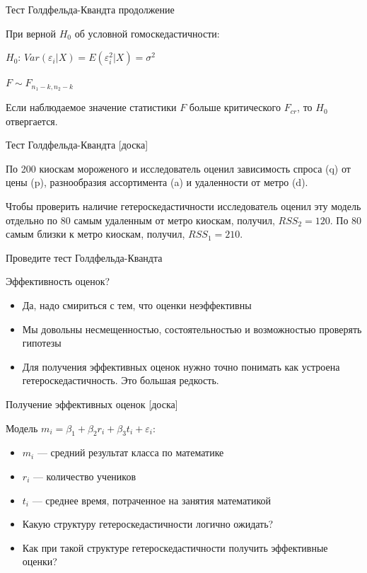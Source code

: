 \documentclass[ignorenonframetext,]{beamer}
\newcommand{\e}{\varepsilon}
\begin{document}
\begin{frame}{Тест Голдфельда-Квандта продолжение}

При верной $H_0$ об условной гомоскедастичности:

$H_0$: $Var(\e_i|X)=E(\varepsilon^2_i|X)=\sigma^2$

$F\sim F_{n_1-k,n_2-k}$

Если наблюдаемое значение статистики $F$ больше критического $F_{cr}$,
то $H_0$ отвергается.

\end{frame}

\begin{frame}{Тест Голдфельда-Квандта {[}доска{]}}

По 200 киоскам мороженого и исследователь оценил зависимость спроса (q)
от цены (p), разнообразия ассортимента (a) и удаленности от метро (d).

Чтобы проверить наличие гетероскедастичности исследователь оценил эту
модель отдельно по 80 самым удаленным от метро киоскам, получил,
$RSS_2=120$. По 80 самым близки к метро киоскам, получил, $RSS_1=210$.

Проведите тест Голдфельда-Квандта

\end{frame}

\begin{frame}{Эффективность оценок?}

\begin{itemize}
\item
  Да, надо смириться с тем, что оценки неэффективны
\item
  Мы довольны несмещенностью, состоятельностью и возможностью проверять
  гипотезы
\item
  Для получения эффективных оценок нужно точно понимать как устроена
  гетероскедастичность. Это большая редкость.
\end{itemize}

\end{frame}

\begin{frame}{Получение эффективных оценок {[}доска{]}}

Модель $m_i = \beta_1 + \beta_2 r_i + \beta_3 t_i + \e_i$:

\begin{itemize}
\item
  $m_i$ --- средний результат класса по математике
\item
  $r_i$ --- количество учеников
\item
  $t_i$ --- среднее время, потраченное на занятия математикой
\item
  Какую структуру гетероскедастичности логично ожидать?
\item
  Как при такой структуре гетероскедастичности получить эффективные
  оценки?
\end{itemize}

\end{frame}
\end{document}
